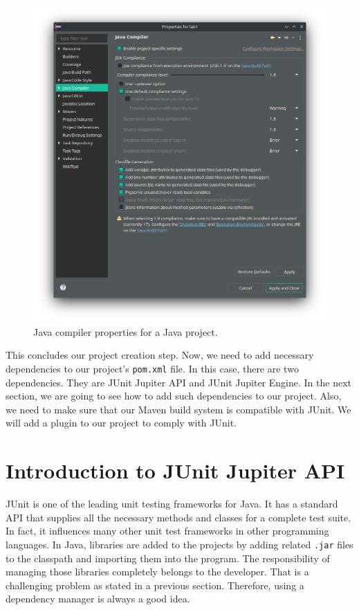 \begin{figure}[H]
    \centering
    \includegraphics[width=\textwidth]{images/java-version.png}
    \caption{Java compiler properties for a Java project.}
    \label{fig:java-version}
\end{figure}

This concludes our project creation step. Now, we need to add necessary dependencies to our project's \lstinline[language={}]|pom.xml| file. In this case, there are two dependencies. They are JUnit Jupiter API and JUnit Jupiter Engine. In the next section, we are going to see how to add such dependencies to our project. Also, we need to make sure that our Maven build system is compatible with JUnit. We will add a plugin to our project to comply with JUnit.

\section{Introduction to JUnit Jupiter API}
JUnit is one of the leading unit testing frameworks for Java. It has a standard API that supplies all the necessary methods and classes for a complete test suite. In fact, it influences many other unit test frameworks in other programming languages. In Java, libraries are added to the projects by adding related \lstinline[language={}]|.jar| files to the classpath and importing them into the program. The responsibility of managing those libraries completely belongs to the developer. That is a challenging problem as stated in a previous section. Therefore, using a dependency manager is always a good idea.

